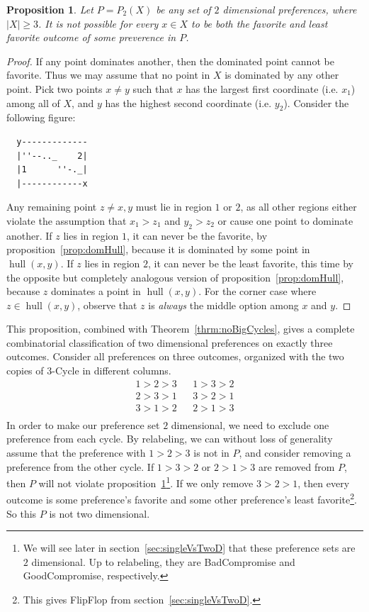 \documentclass[12pt]{article}
\newtheorem{proposition}[theorem]{Proposition}
\DeclareMathOperator*{\hull}{hull}
\newcommand{\1}[1]{\mathds{1}[{#1}]}
\begin{document}
    \begin{proposition}\label{prop:noAllBestWorst}
      Let $P = P_2(X)$ be any set of $2$ dimensional preferences,
      where $|X| \ge 3$.
      It is not possible for every $x\in X$ to be both the
      favorite and least favorite outcome of some preverence in $P$.
    \end{proposition}
    \begin{proof}
      If any point dominates another, then the dominated point cannot be favorite.
      Thus we may assume that no point in $X$ is dominated
      by any other point. Pick two points $x \ne y$ such that $x$ has the largest
      first coordinate (i.e. $x_1$) among all of $X$, and $y$ has the highest second
      coordinate (i.e. $y_2$).
      Consider the following figure:
      \begin{verbatim}
  y-------------
  |''--.._    2|
  |1      ''-._|
  |------------x
      \end{verbatim}
      Any remaining point $z\ne x,y$ must lie in region $1$ or $2$, as all other
      regions either violate the assumption that $x_1 > z_1$ and $y_2 > z_2$
      or cause one point to dominate another.
      If $z$ lies in region $1$, it can never be the favorite, by
      proposition~\ref{prop:domHull}, because it is dominated by some point in
      $\hull(x,y)$.
      If $z$ lies in region $2$, it can never be the least favorite, this time
      by the opposite but completely analogous version of 
      proposition~\ref{prop:domHull}, because $z$ dominates a point in $\hull(x,y)$.
      For the corner case where $z\in\hull(x,y)$, observe that $z$ is
      \emph{always} the middle option among $x$ and $y$.
    \end{proof}

    This proposition, combined with Theorem~\ref{thrm:noBigCycles}, gives a
    complete combinatorial classification of two dimensional preferences on
    exactly three outcomes. Consider all preferences on three outcomes,
    organized with the two copies of $3$-{\sc Cycle} in different columns.
    \begin{align*}
      1 > 2 > 3 && 1 > 3 > 2 \\
      2 > 3 > 1 && 3 > 2 > 1 \\
      3 > 1 > 2 && 2 > 1 > 3 \\
    \end{align*}
    In order to make our preference set $2$ dimensional, we need to exclude one
    preference from each cycle.
    By relabeling, we can without loss of generality assume that the
    preference with $1 > 2 > 3$ is not in $P$, and consider removing a
    preference from the other cycle.
    If $1 > 3 > 2$ or $2 > 1 > 3$ are removed from $P$, then $P$ will not
    violate proposition~\ref{prop:noAllBestWorst}\footnote{
      We will see later in section~\ref{sec:singleVsTwoD}
      that these preference sets are $2$ dimensional. Up to relabeling, they are
      {\sc BadCompromise} and {\sc GoodCompromise}, respectively.
    }.
    If we only remove $3 > 2 > 1$, then every outcome is some preference's
    favorite and some other preference's least favorite\footnote{
      This gives {\sc FlipFlop} from section~\ref{sec:singleVsTwoD}.
    }.
    So this $P$ is not two dimensional.
\end{document}
